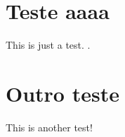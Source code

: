 
    \section{{{Teste aaaa}}}

    This is just a test. \cite{weber2010}.

    \newpage
    \section{{{Outro teste}}}

    This is another test! \cite{weber2010internet}
